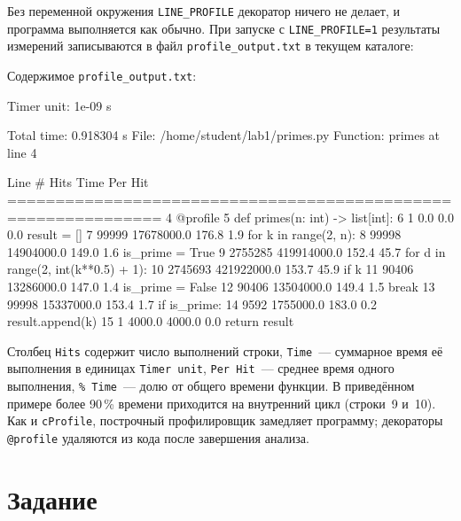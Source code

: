 \documentclass[11pt,a4paper]{article}
\newcommand{\code}[1]{\texttt{#1}}
\begin{document}
Без переменной окружения \code{LINE\_PROFILE} декоратор ничего не делает, и программа
выполняется как обычно. При запуске с \code{LINE\_PROFILE=1} результаты измерений записываются
в файл \code{profile\_output.txt} в текущем каталоге:

Содержимое \code{profile\_output.txt}:
\begin{plainwide}
Timer unit: 1e-09 s

Total time: 0.918304 s
File: /home/student/lab1/primes.py
Function: primes at line 4

Line #      Hits         Time  Per Hit   %
==============================================================
     4                                           @profile
     5                                           def primes(n: int) -> list[int]:
     6         1          0.0      0.0      0.0      result = []
     7     99999   17678000.0    176.8      1.9      for k in range(2, n):
     8     99998   14904000.0    149.0      1.6          is_prime = True
     9   2755285  419914000.0    152.4     45.7          for d in range(2, int(k**0.5) + 1):
    10   2745693  421922000.0    153.7     45.9              if k %
    11     90406   13286000.0    147.0      1.4                  is_prime = False
    12     90406   13504000.0    149.4      1.5                  break
    13     99998   15337000.0    153.4      1.7          if is_prime:
    14      9592    1755000.0    183.0      0.2              result.append(k)
    15         1       4000.0   4000.0      0.0      return result
\end{plainwide}

Столбец \code{Hits} содержит число выполнений строки, \code{Time}~— суммарное время её
выполнения в единицах \code{Timer unit}, \code{Per Hit}~— среднее время одного выполнения,
\code{\% Time}~— долю от общего времени функции. В приведённом примере более 90\,\% времени
приходится на внутренний цикл (строки~9 и~10). Как и \code{cProfile}, построчный профилировщик
замедляет программу; декораторы \code{@profile} удаляются из кода после завершения анализа.

\section{Задание}
\end{document}
